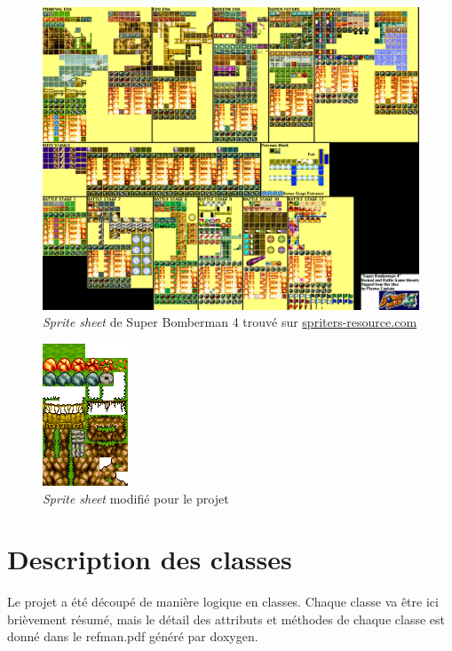 \documentclass[a4paper,10pt]{report}
\begin{document}
\begin{figure}
 \begin{center}
  \includegraphics[scale=0.4]{rawSheet.png}
 \end{center}
 \caption{\textit{Sprite sheet} de Super Bomberman 4 trouvé sur \href{http://www.spriters-resource.com/fullview/60516/}{spriters-resource.com}}
 \label{rawSheet}
\end{figure}
\begin{figure}
 \begin{center}
  \includegraphics[scale=0.44]{customSheet.png}
 \end{center}
 \caption{\textit{Sprite sheet} modifié pour le projet}
 \label{customSheet}
\end{figure}

\section{Description des classes}
Le projet a été découpé de manière logique en classes. Chaque classe va être ici brièvement résumé, mais le détail des attributs et méthodes de chaque classe est donné dans le refman.pdf généré par doxygen.
\end{document}
